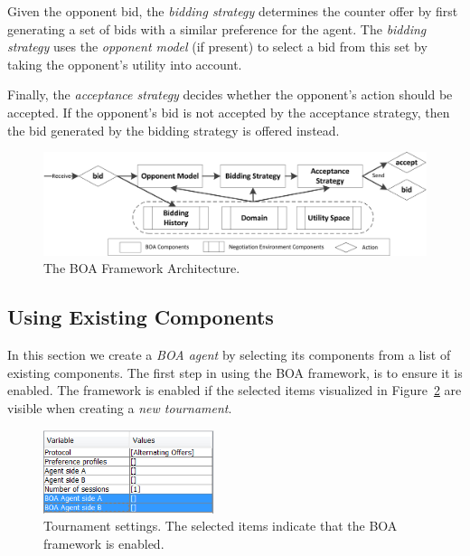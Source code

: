 \documentclass[]{article}
\begin{document}
Given the opponent bid, the \textit{bidding strategy} determines the counter offer by first generating a set of bids with a similar preference for the agent. The \textit{bidding strategy} uses the \textit{opponent model} (if present) to select a bid from this set by taking the opponent's utility into account.

Finally, the \textit{acceptance strategy} decides whether the opponent's action should be accepted. If the opponent's bid is not accepted by the acceptance strategy, then the bid generated by the bidding strategy is offered instead.

\begin{figure}[t] 
	\center
	\includegraphics[width=14cm]{media/Decoupled_FlowChart.png}
	\caption{The BOA Framework Architecture.}
	\label{fig:flowchart}
\end{figure}

\subsection{Using Existing Components}
In this section we create a \textit{BOA agent} by selecting its components from a list of existing components. The first step in using the BOA framework, is to ensure it is enabled. The framework is enabled if the selected items visualized in Figure~\ref{fig:settings} are visible when creating a \textit{new tournament}.%

\begin{figure}[h!]
	\center
	\includegraphics[width=5cm]{media/Decoupled_TournamentSettings.png}
	\caption{Tournament settings. The selected items indicate that the BOA framework is enabled.}
	\label{fig:settings}
\end{figure}
\end{document}
